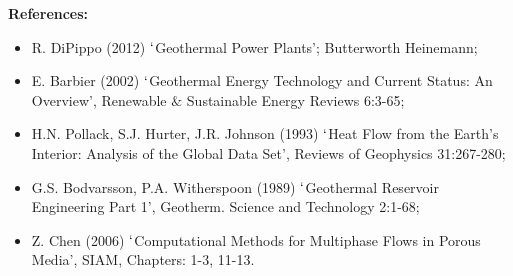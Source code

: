 \documentclass[12pts,a4paper,amsmath,amssymb,floatfix]{article}%
\begin{document}
\begin{enumerate}[label=\bfseries Project:]
\noindent
{\bf References:}
\begin{itemize}
\item R. DiPippo (2012) $\lq$Geothermal Power Plants'; Butterworth Heinemann;
\item E. Barbier (2002) $\lq$Geothermal Energy Technology and Current Status: An Overview', Renewable $\&$ Sustainable Energy Reviews 6:3-65;
\item H.N. Pollack, S.J. Hurter, J.R. Johnson (1993) $\lq$Heat Flow from the Earth's Interior: Analysis of the Global Data Set', Reviews of Geophysics 31:267-280;
\item G.S. Bodvarsson, P.A. Witherspoon (1989) $\lq$Geothermal Reservoir Engineering Part 1', Geotherm. Science and Technology 2:1-68;
\item Z. Chen (2006) $\lq$Computational Methods for Multiphase Flows in Porous Media', SIAM, Chapters: 1-3, 11-13.
\end{itemize}


\end{enumerate}
\end{document}
